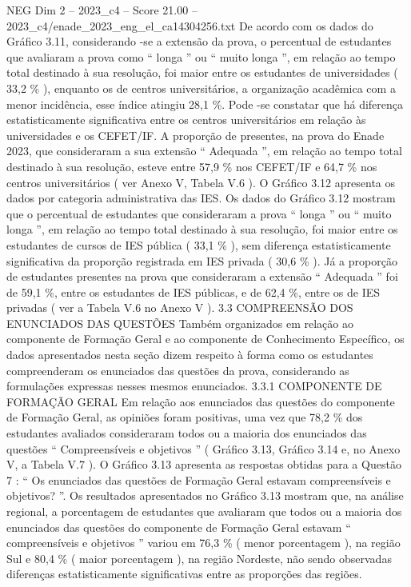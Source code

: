 \begin{textsample}{NEG Dim 2 – 2023\_c4 – Score 21.00 – 2023\_c4/enade\_2023\_eng\_el\_ca14304256.txt}
De acordo com os dados do Gráfico 3.11, considerando -se a extensão da prova, o percentual de estudantes que avaliaram a prova como “ longa ” ou “ muito longa ”, em relação ao tempo total destinado à sua resolução, foi maior entre os estudantes de universidades ( 33,2 \% ), enquanto os de centros universitários, a organização acadêmica com a menor incidência, esse índice atingiu 28,1 \%.
Pode -se constatar que há diferença estatisticamente significativa entre os centros universitários em relação às universidades e os CEFET/IF.
A proporção de presentes, na prova do Enade 2023, que consideraram a sua extensão “ Adequada ”, em relação ao tempo total destinado à sua resolução, esteve entre 57,9 \% nos CEFET/IF e 64,7 \% nos centros universitários ( ver Anexo V, Tabela V.6 ).
O Gráfico 3.12 apresenta os dados por categoria administrativa das IES.
Os dados do Gráfico 3.12 mostram que o percentual de estudantes que consideraram a prova “ longa ” ou “ muito longa ”, em relação ao tempo total destinado à sua resolução, foi maior entre os estudantes de cursos de IES pública ( 33,1 \% ), sem diferença estatisticamente significativa da proporção registrada em IES privada ( 30,6 \% ).
Já a proporção de estudantes presentes na prova que consideraram a extensão “ Adequada ” foi de 59,1 \%, entre os estudantes de IES públicas, e de 62,4 \%, entre os de IES privadas ( ver a Tabela V.6 no Anexo V ). 3.3 COMPREENSÃO DOS ENUNCIADOS DAS QUESTÕES Também organizados em relação ao componente de Formação Geral e ao componente de Conhecimento Específico, os dados apresentados nesta seção dizem respeito à forma como os estudantes compreenderam os enunciados das questões da prova, considerando as formulações expressas nesses mesmos enunciados. 3.3.1 COMPONENTE DE FORMAÇÃO GERAL Em relação aos enunciados das questões do componente de Formação Geral, as opiniões foram positivas, uma vez que 78,2 \% dos estudantes avaliados consideraram todos ou a maioria dos enunciados das questões “ Compreensíveis e objetivos ” ( Gráfico 3.13, Gráfico 3.14 e, no Anexo V, a Tabela V.7 ).
O Gráfico 3.13 apresenta as respostas obtidas para a Questão 7 : “ Os enunciados das questões de Formação Geral estavam compreensíveis e objetivos? ”.
Os resultados apresentados no Gráfico 3.13 mostram que, na análise regional, a porcentagem de estudantes que avaliaram que todos ou a maioria dos enunciados das questões do componente de Formação Geral estavam “ compreensíveis e objetivos ” variou em 76,3 \% ( menor porcentagem ), na região Sul e 80,4 \% ( maior porcentagem ), na região Nordeste, não sendo observadas diferenças estatisticamente significativas entre as proporções das regiões.

\end{textsample}
